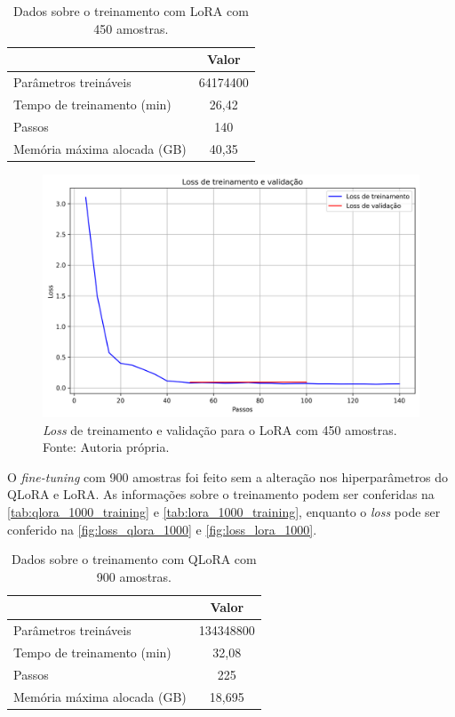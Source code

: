 \begin{table}[ht]
    \caption{\small Dados sobre o treinamento com \ac{LoRA} com 450 amostras.}
    \centering
    \begin{tabular}{l|c}
        \hline
                                    & Valor    \\ \hline
        Parâmetros treináveis       & 64174400 \\
        Tempo de treinamento (min)  & 26,42    \\
        Passos                      & 140      \\
        Memória máxima alocada (GB) & 40,35    \\ \hline
    \end{tabular}
    \label{tab:lora_500_training}
\end{table}

\clearpage

\begin{figure}[ht]
    \centering
    \includegraphics[width=0.725\columnwidth,keepaspectratio]{images/loss_lora_500.png}
    \caption{\small \textit{Loss} de treinamento e validação para o \ac{LoRA} com 450 amostras. Fonte: Autoria própria.}
    \label{fig:loss_lora_500}
\end{figure}

O \textit{fine-tuning} com 900 amostras foi feito sem a alteração nos hiperparâmetros do \ac{QLoRA} e \ac{LoRA}. As informações sobre o treinamento podem ser conferidas
na \autoref{tab:qlora_1000_training} e \autoref{tab:lora_1000_training}, enquanto o \textit{loss} pode ser conferido na \autoref{fig:loss_qlora_1000} e
\autoref{fig:loss_lora_1000}.

\begin{table}[ht]
    \caption{\small Dados sobre o treinamento com \ac{QLoRA} com 900 amostras.}
    \centering
    \begin{tabular}{l|c}
        \hline
                                    & Valor     \\ \hline
        Parâmetros treináveis       & 134348800 \\
        Tempo de treinamento (min)  & 32,08     \\
        Passos                      & 225       \\
        Memória máxima alocada (GB) & 18,695    \\ \hline
    \end{tabular}
    \label{tab:qlora_1000_training}
\end{table}

